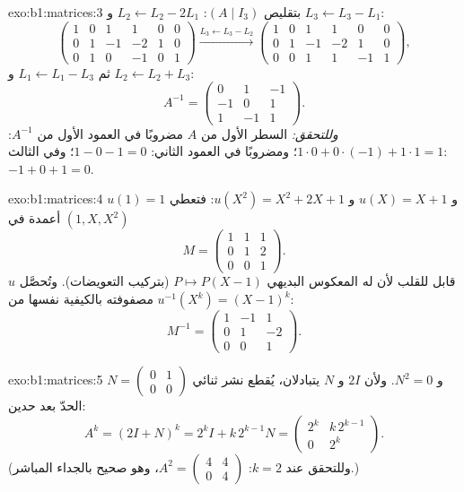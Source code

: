 \begin{solution}{exo:b1:matrices:3}
بتقليص $(A \mid I_3)$: $L_2 \leftarrow L_2 - 2L_1$ و $L_3
\leftarrow L_3 - L_1$:
\[
\begin{pmatrix}
1 & 0 & 1 & 1 & 0 & 0\\
0 & 1 & -1 & -2 & 1 & 0\\
0 & 1 & 0 & -1 & 0 & 1
\end{pmatrix}
\xrightarrow{L_3 \leftarrow L_3 - L_2}
\begin{pmatrix}
1 & 0 & 1 & 1 & 0 & 0\\
0 & 1 & -1 & -2 & 1 & 0\\
0 & 0 & 1 & 1 & -1 & 1
\end{pmatrix},
\]
ثم $L_1 \leftarrow L_1 - L_3$ و $L_2 \leftarrow L_2 + L_3$:
\[
A^{-1} = \begin{pmatrix}
0 & 1 & -1\\
-1 & 0 & 1\\
1 & -1 & 1
\end{pmatrix}.
\]
\emph{وللتحقق:} السطر الأول من $A$ مضروبًا في العمود الأول من $A^{-1}$: $1
\cdot 0 + 0\cdot(-1) + 1\cdot 1 = 1$؛ ومضروبًا في العمود الثاني: $1 - 0 -
1 = 0$؛ وفي الثالث: $-1 + 0 + 1 = 0$.
\end{solution}

\begin{solution}{exo:b1:matrices:4}
$u(1) = 1$ و $u(X) = X + 1$ و $u(X^2) = X^2 + 2X + 1$: فتعطي أعمدة
 في $(1, X, X^2)$
\[
M = \begin{pmatrix}
1 & 1 & 1\\
0 & 1 & 2\\
0 & 0 & 1
\end{pmatrix}.
\]
 $u$ قابل للقلب لأن له المعكوس البديهي $P \mapsto P(X
- 1)$ (بتركيب التعويضات). وتُحصَّل مصفوفته بالكيفية
نفسها من $u^{-1}(X^k) = (X-1)^k$:
\[
M^{-1} = \begin{pmatrix}
1 & -1 & 1\\
0 & 1 & -2\\
0 & 0 & 1
\end{pmatrix}.
\]
\end{solution}

\begin{solution}{exo:b1:matrices:5}
$N = \begin{pmatrix} 0 & 1\\ 0 & 0\end{pmatrix}$ و $N^2 = 0$. ولأن
$2I$ و $N$ يتبادلان، يُقطع نشر ثنائي الحدّ بعد
حدين:
\[
A^k = (2I + N)^k = 2^k I + k\,2^{k-1} N
= \begin{pmatrix} 2^k & k\,2^{k-1}\\ 0 & 2^k\end{pmatrix}.
\]
(وللتحقق عند $k = 2$: $A^2 = \begin{pmatrix}4 & 4\\ 0 & 4\end{pmatrix}$،
وهو صحيح بالجداء المباشر.)
\end{solution}

